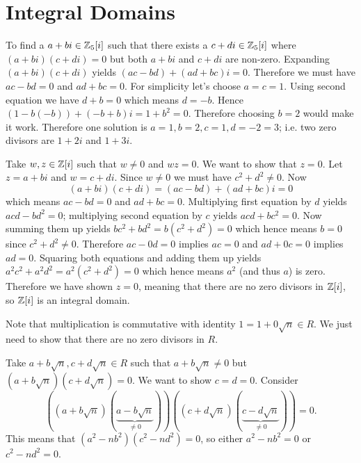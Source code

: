 \section{Integral Domains}
\begin{questions}
    \item To find a $a+bi \in \mathbb{Z}_5[i]$ such that there exists a $c+di \in \mathbb{Z}_5[i]$ where $(a+bi)(c+di) = 0$ but both $a+bi$ and $c+di$ are non-zero. Expanding $(a+bi)(c+di)$ yields $(ac-bd)+(ad+bc)i = 0$. Therefore we must have $ac-bd = 0$ and $ad+bc = 0$. For simplicity let's choose $a=c=1$. Using second equation we have $d+b = 0$ which means $d = -b$. Hence $(1 - b(-b))+(-b + b)i = 1+b^2 = 0$. Therefore choosing $b = 2$ would make it work. Therefore one solution is $a = 1, b = 2, c = 1, d = -2 = 3$; i.e. two zero divisors are $1+2i$ and $1+3i$.
    
    \item Take $w, z \in \mathbb{Z}[i]$ such that $w \neq 0$ and $wz = 0$. We want to show that $z = 0$. Let $z = a+bi$ and $w = c+di$. Since $w \neq 0$ we must have $c^2+d^2 \neq 0$. Now
    \[
        (a+bi)(c+di) = (ac-bd)+(ad+bc)i = 0
    \]
    which means $ac - bd = 0$ and $ad+bc = 0$. Multiplying first equation by $d$ yields $acd - bd^2 = 0$; multiplying second equation by $c$ yields $acd + bc^2 = 0$. Now summing them up yields $bc^2+bd^2 = b(c^2+d^2) = 0$ which hence means $b = 0$ since $c^2+d^2 \neq 0$. Therefore $ac - 0d = 0$ implies $ac = 0$ and $ad+0c = 0$ implies $ad = 0$. Squaring both equations and adding them up yields $a^2c^2 + a^2d^2 = a^2(c^2+d^2) = 0$ which hence means $a^2$ (and thus $a$) is zero. Therefore we have shown $z = 0$, meaning that there are no zero divisors in $\mathbb{Z}[i]$, so $\mathbb{Z}[i]$ is an integral domain.

    \item \begin{partquestions}{\alph*}
        \item Note that multiplication is commutative with identity $1 = 1 + 0\sqrt{n} \in R$. We just need to show that there are no zero divisors in $R$.
        
        Take $a+b\sqrt n, c+d\sqrt n \in R$ such that $a+b\sqrt n \neq 0$ but $(a+b\sqrt n)(c+d\sqrt n) = 0$. We want to show $c = d = 0$. Consider
        \[
            \left((a+b\sqrt n)(\underbrace{a-b\sqrt n}_{\neq 0})\right)\left((c+d\sqrt n)(\underbrace{c-d\sqrt n}_{\neq 0})\right) = 0.
        \]
        This means that $(a^2-nb^2)(c^2-nd^2) = 0$, so either $a^2-nb^2 = 0$ or $c^2-nd^2 = 0$.


\end{partquestions}
\end{questions}
